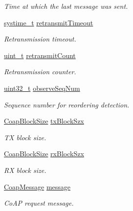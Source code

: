 \begin{DoxyCompactItemize}
\begin{DoxyCompactList}\small\item\em Time at which the last message was sent. \end{DoxyCompactList}\item 
\hyperlink{compiler__port_8h_ae3e32a98d431a02106616da3071832dd}{systime\+\_\+t} \hyperlink{struct__CoapClientRequest_a7419bf61bbf904c2c6270c432fdfe95f}{retransmit\+Timeout}
\begin{DoxyCompactList}\small\item\em Retransmission timeout. \end{DoxyCompactList}\item 
\hyperlink{compiler__port_8h_a12a1e9b3ce141648783a82445d02b58d}{uint\+\_\+t} \hyperlink{struct__CoapClientRequest_a2bc7c138cdc50d8acceeecbd8dbe1f7a}{retransmit\+Count}
\begin{DoxyCompactList}\small\item\em Retransmission counter. \end{DoxyCompactList}\item 
\hyperlink{stdint_8h_a435d1572bf3f880d55459d9805097f62}{uint32\+\_\+t} \hyperlink{struct__CoapClientRequest_a492e4c38257c6ed5fac3831e1b4c686b}{observe\+Seq\+Num}
\begin{DoxyCompactList}\small\item\em Sequence number for reordering detection. \end{DoxyCompactList}\item 
\hyperlink{coap__option_8h_ad1e9eed649f4a72e0e2219dae49cbae8}{Coap\+Block\+Size} \hyperlink{struct__CoapClientRequest_a0eedb06014e31a9d221ea39badff8b04}{tx\+Block\+Szx}
\begin{DoxyCompactList}\small\item\em TX block size. \end{DoxyCompactList}\item 
\hyperlink{coap__option_8h_ad1e9eed649f4a72e0e2219dae49cbae8}{Coap\+Block\+Size} \hyperlink{struct__CoapClientRequest_aaa922cd85a12bc48e3b2c5a2aca54342}{rx\+Block\+Szx}
\begin{DoxyCompactList}\small\item\em RX block size. \end{DoxyCompactList}\item 
\hyperlink{structCoapMessage}{Coap\+Message} \hyperlink{struct__CoapClientRequest_afbf9d205858ab6a1a64deb97d3141f10}{message}
\begin{DoxyCompactList}\small\item\em Co\+AP request message. \end{DoxyCompactList}\item 

\end{DoxyCompactItemize}
